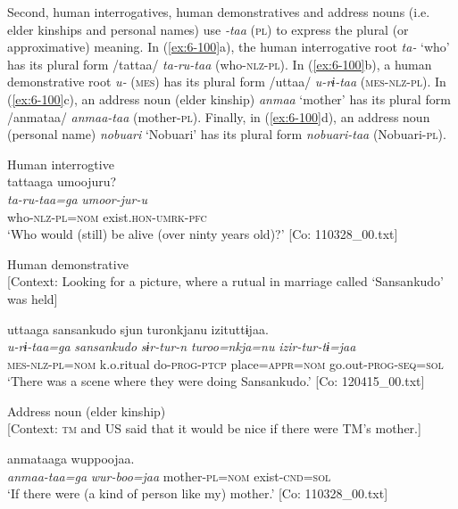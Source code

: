   Second, human interrogatives, human demonstratives and address nouns (i.e. elder kinships and personal names) use \textit{-taa} (\textsc{pl}) to express the plural (or approximative) meaning. In (\ref{ex:6-100}a), the human interrogative root \textit{ta-} ‘who’ has its plural form /tattaa/ \textit{ta-ru-taa} (who-\textsc{nlz}-\textsc{pl}). In (\ref{ex:6-100}b), a human demonstrative root \textit{u-} (\textsc{mes}) has its plural form /uttaa/ \textit{u-rɨ-taa} (\textsc{mes}-\textsc{nlz}-\textsc{pl}). In (\ref{ex:6-100}c), an address noun (elder kinship) \textit{anmaa} ‘mother’ has its plural form /anmataa/ \textit{anmaa-taa} (mother-\textsc{pl}). Finally, in (\ref{ex:6-100}d), an address noun (personal name) \textit{nobuari} ‘Nobuari’ has its plural form \textit{nobuari-taa} (Nobuari-\textsc{pl}).

\ea\label{ex:6-100}
 \ea Human interrogtive\\
{\US}
\glll tattaaga  umoojuru?\\
      \textit{ta-ru-taa=ga}  \textit{umoor-jur-u}\\
      who-\textsc{nlz}-\textsc{pl}=\textsc{nom}  exist.\textsc{hon}-\textsc{umrk}-\textsc{pfc}\\
\glt ‘Who would (still) be alive (over ninty years old)?’ [Co: 110328\_00.txt]
\z

\ex Human demonstrative\\{}
[Context: Looking for a picture, where a rutual in marriage called ‘Sansankudo’ was held]

{\TM}
\glll uttaaga  {\textbar}sansankudo{\textbar}  sjun  turonkjanu      izituttɨjaa.\\
      \textit{u-rɨ-taa=ga}  \textit{sansankudo}  \textit{sɨr-tur-n}  \textit{turoo=nkja=nu}    \textit{izir-tur-tɨ=jaa}\\
      \textsc{mes}-\textsc{nlz}-\textsc{pl}=\textsc{nom}  k.o.ritual  do-\textsc{prog}-\textsc{ptcp}  place=\textsc{appr}=\textsc{nom}      go.out-\textsc{prog}-\textsc{seq}=\textsc{sol}\\
\glt ‘There was a scene where they were doing Sansankudo.’ [Co: 120415\_00.txt]
\z

\ex Address noun (elder kinship)\\{}
[Context: \textsc{tm} and US said that it would be nice if there were TM’s mother.]

{\TM}
\glll anmataaga  wuppoojaa.\\
      \textit{anmaa-taa=ga}  \textit{wur-boo=jaa}
      mother-\textsc{pl}=\textsc{nom}  exist-\textsc{cnd}=\textsc{sol}\\
\glt ‘If there were (a kind of person like my) mother.’ [Co: 110328\_00.txt]
\z

